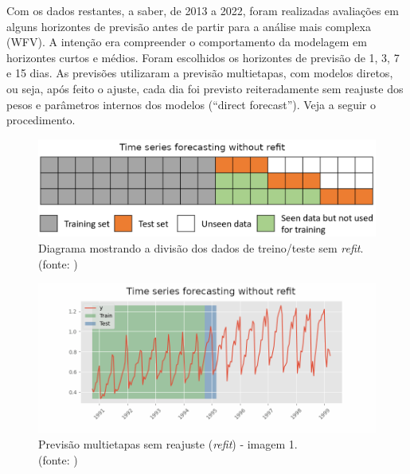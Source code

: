 Com os dados restantes, a saber, de 2013 a 2022, foram realizadas avaliações em alguns horizontes de previsão antes de partir para a análise mais complexa (WFV). A intenção era compreender o comportamento da modelagem em horizontes curtos e médios. Foram escolhidos os horizontes de previsão de 1, 3, 7 e 15 dias. As previsões utilizaram a previsão multietapas, com modelos diretos, ou seja, após feito o ajuste, cada dia foi previsto reiteradamente sem reajuste dos pesos e parâmetros internos dos modelos (``direct forecast''). Veja a seguir o procedimento.

\begin{figure}[!h]
	\centering
	\includegraphics[scale=0.3]{Figuras/skforecast-diagram-backtesting-no-refit.png}
	\caption{Diagrama mostrando a divisão dos dados de treino/teste sem \textit{refit}.\\(fonte: \cite{skforecast})}
	\label{fig:skforecast-diagram-backtesting-no-refit}
\end{figure}

\begin{figure}[!h]
	\centering
	\includegraphics[scale=0.3]{Figuras/imagem1_skforecast-backtesting-no-refit.png}
	\caption{Previsão multietapas sem reajuste (\textit{refit}) - imagem 1.\\(fonte: \cite{skforecast})}
	\label{fig:imagem1_skforecast-backtesting-no-refit}
\end{figure}

